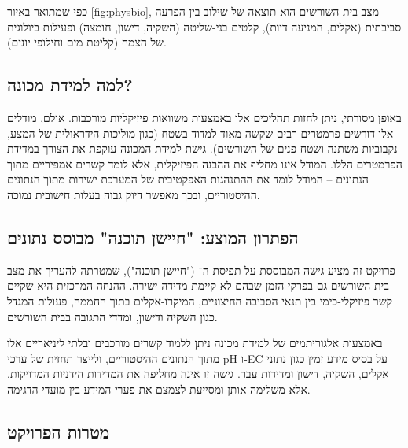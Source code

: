 כפי שמתואר באיור \ref{fig:physbio}, מצב בית השורשים הוא תוצאה של שילוב בין הפרעה סביבתית (אקלים, המניעה דיות), קלטים בני-שליטה (השקיה, דישון, חומצה) ופעילות ביולוגית של הצמח (קליטת מים וחילופי יונים).

\subsection{למה למידת מכונה?}
באופן מסורתי, ניתן לחזות תהליכים אלו באמצעות משוואות פיזיקליות מורכבות. אולם, מודלים אלו דורשים פרמטרים רבים שקשה מאוד למדוד בשטח (כגון מוליכות הידראולית של המצע, נקבוביות משתנה ושטח פנים של השורשים). גישת למידת המכונה  עוקפת את הצורך במדידת הפרמטרים הללו. המודל אינו מחליף את ההבנה הפיזיקלית, אלא לומד קשרים אמפיריים מתוך הנתונים -- המודל לומד את ההתנהגות האפקטיבית של המערכת ישירות מתוך הנתונים ההיסטוריים, ובכך מאפשר דיוק גבוה בעלות חישובית נמוכה.

\subsection{הפתרון המוצע: "חיישן תוכנה" מבוסס נתונים}
פרויקט זה מציע גישה המבוססת על תפיסת ה־ ("חיישן תוכנה"), שמטרתה להעריך את מצב בית השורשים גם בפרקי הזמן שבהם לא קיימת מדידה ישירה. ההנחה המרכזית היא שקיים קשר פיזיקלי-כימי בין תנאי הסביבה החיצוניים, המיקרו-אקלים בתוך החממה, פעולות המגדל כגון השקיה ודישון, ומדדי התגובה בבית השורשים.

באמצעות אלגוריתמים של למידת מכונה ניתן ללמוד קשרים מורכבים ובלתי ליניאריים אלו מתוך הנתונים ההיסטוריים, ולייצר תחזית של ערכי pH ו-EC על בסיס מידע זמין כגון נתוני אקלים, השקיה, דישון ומדידות עבר. גישה זו אינה מחליפה את המדידות הידניות המדויקות, אלא משלימה אותן ומסייעת לצמצם את פערי המידע בין מועדי הדגימה.

\subsection{מטרות הפרויקט}


